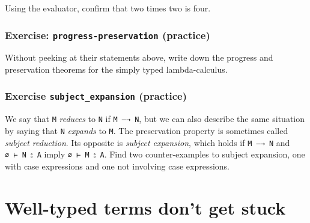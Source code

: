 Using the evaluator, confirm that two times two is four.

\begin{fence}
\begin{code}%
\>[0]\<%
\end{code}
\end{fence}

\hypertarget{exercise-progress-preservation-practice}{%
\subsubsection{\texorpdfstring{Exercise: \texttt{progress-preservation}
(practice)}{Exercise: progress-preservation (practice)}}\label{exercise-progress-preservation-practice}}

Without peeking at their statements above, write down the progress and
preservation theorems for the simply typed lambda-calculus.

\begin{fence}
\begin{code}%
\>[0]\<%
\end{code}
\end{fence}

\hypertarget{exercise-subject_expansion-practice}{%
\subsubsection{\texorpdfstring{Exercise \texttt{subject\_expansion}
(practice)}{Exercise subject\_expansion (practice)}}\label{exercise-subject_expansion-practice}}

We say that \texttt{M} \emph{reduces} to \texttt{N} if
\texttt{M\ —→\ N}, but we can also describe the same situation by saying
that \texttt{N} \emph{expands} to \texttt{M}. The preservation property
is sometimes called \emph{subject reduction}. Its opposite is
\emph{subject expansion}, which holds if \texttt{M\ —→\ N} and
\texttt{∅\ ⊢\ N\ ⦂\ A} imply \texttt{∅\ ⊢\ M\ ⦂\ A}. Find two
counter-examples to subject expansion, one with case expressions and one
not involving case expressions.

\begin{fence}
\begin{code}%
\>[0]\<%
\end{code}
\end{fence}

\hypertarget{well-typed-terms-dont-get-stuck}{%
\section{Well-typed terms don't get
stuck}\label{well-typed-terms-dont-get-stuck}}


